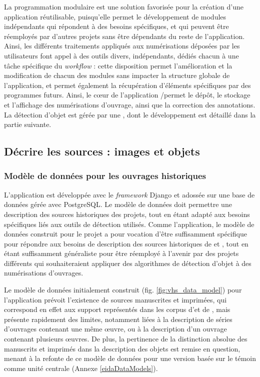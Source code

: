     La programmation modulaire est une solution favorisée pour la création d'une application réutilisable, puisqu'elle permet le développement de modules indépendants qui répondent à des besoins spécifiques, et qui peuvent être réemployés par d'autres projets sans être dépendants du reste de l'application. Ainsi, les différents traitements appliqués aux numérisations déposées par les utilisateurs font appel à des outils divers, indépendants, dédiés chacun à une tâche spécifique du \textit{workflow} : cette disposition permet l'amélioration et la modification de chacun des modules sans impacter la structure globale de l'application, et permet également la récupération d'éléments spécifiques par des programmes futurs. Ainsi, le cœur de l'application \eida/\vhs permet le dépôt, le stockage et l'affichage des numérisations d'ouvrage, ainsi que la correction des annotations. La détection d'objet est gérée par une \api, dont le développement est détaillé dans la partie suivante.
    
\subsection{Décrire les sources : images et objets}
    \subsubsection{Modèle de données pour les ouvrages historiques}
    L'application \vhs est développée avec le \textit{framework} Django et adossée sur une base de données gérée avec PostgreSQL. Le modèle de données doit permettre une description des sources historiques des projets, tout en étant adapté aux besoins spécifiques liés aux outils de détection utilisés. Comme l'application, le modèle de données construit pour le projet a pour vocation d'être suffisamment spécifique pour répondre aux besoins de description des sources historiques de \vhs et \eida, tout en étant suffisamment généraliste pour être réemployé à l'avenir par des projets différents qui souhaiteraient appliquer des algorithmes de détection d'objet à des numérisations d'ouvrages.
    
    Le modèle de données initialement construit (fig. \ref{fig:vhs_data_model}) pour l'application \vhs prévoit l'existence de sources manuscrites et imprimées, qui correspond en effet aux support représentés dans les corpus d'\eida et de \vhs, mais présente rapidement des limites, notamment liées à la description de séries d'ouvrages contenant une même œuvre, ou à la description d'un ouvrage contenant plusieurs œuvres. De plus, la pertinence de la distinction absolue des manuscrits et imprimés dans la description des objets est remise en question, menant à la refonte de ce modèle de données pour une version basée sur le témoin comme unité centrale (Annexe \ref{eidaDataModels}). 
    
